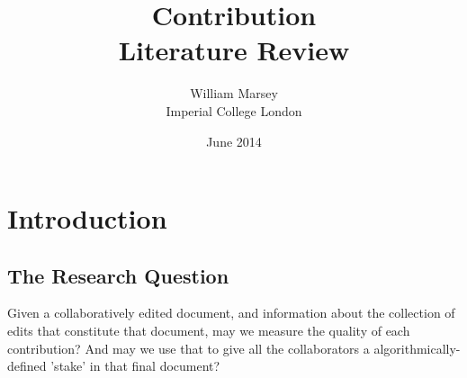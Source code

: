\documentclass[a4paper,11pt,twoside,notitlepage]{article}
\renewenvironment{abstract}
 {
	\small
  	\begin{center}
  	\bfseries \abstractname\vspace{-.5em}\vspace{0pt}
  	\end{center}
  	\list{}{
    	\setlength{\leftmargin}{.5cm}%
    	\setlength{\rightmargin}{\leftmargin}%
  	}%
  	\item\relax}
 	{\endlist}
\begin{document}
	\title{Contribution
		\\ \small Literature Review}
	\author{William Marsey
		\\Imperial College London}
	\date{June 2014}
 	\maketitle	

	

	
          
        \section{Introduction}
        \subsection{The Research Question}
        Given a collaboratively edited document, and information about
        the collection of edits that constitute that document, may we
        measure the quality of each contribution? And may we use that
        to give all the collaborators a algorithmically-defined 'stake'
        in that final document?
        
\end{document}
